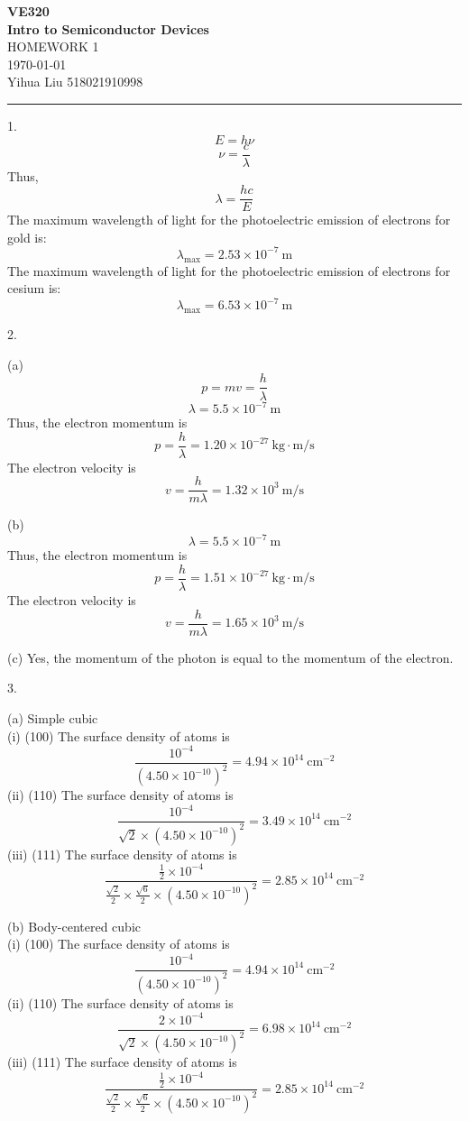 \documentclass[a4paper]{article}
\begin{document}
\begin{center}
\huge
\textbf{VE320\\Intro to Semiconductor Devices\\}
\Large
\vspace{30pt}
\uppercase{Homework 1}\\
\vspace{5pt}\today\\
\vspace{5pt}
Yihua Liu 518021910998
\vspace{5pt}
\rule[-10pt]{.97\linewidth}{0.05em}
\end{center}

1.
$$E=h\nu$$
$$\nu=\frac{c}{\lambda}$$
Thus,
$$\lambda=\frac{hc}{E}$$
The maximum wavelength of light for the photoelectric emission of electrons for gold is:
$$\lambda_\text{max}=2.53\times10^{-7}\ \text{m}$$
The maximum wavelength of light for the photoelectric emission of electrons for cesium is:
$$\lambda_\text{max}=6.53\times10^{-7}\ \text{m}$$

2.

(a)
$$p=mv=\frac{h}{\lambda}$$
$$\lambda=5.5\times10^{-7}\ \text{m}$$
Thus, the electron momentum is
$$p=\frac{h}{\lambda}=1.20\times10^{-27}\ \text{kg}\cdot\text{m/s}$$
The electron velocity is
$$v=\frac{h}{m\lambda}=1.32\times10^3\ \text{m/s}$$

(b)
$$\lambda=5.5\times10^{-7}\ \text{m}$$
Thus, the electron momentum is
$$p=\frac{h}{\lambda}=1.51\times10^{-27}\ \text{kg}\cdot\text{m/s}$$
The electron velocity is
$$v=\frac{h}{m\lambda}=1.65\times10^3\ \text{m/s}$$

(c) Yes, the momentum of the photon is equal to the momentum of the electron.

3.

(a) Simple cubic\\
(i) (100) The surface density of atoms is
$$\frac{10^{-4}}{(4.50\times10^{-10})^2}=4.94\times10^{14}\ \text{cm}^{-2}$$
(ii) (110) The surface density of atoms is
$$\frac{10^{-4}}{\sqrt{2}\times(4.50\times10^{-10})^2}=3.49\times10^{14}\ \text{cm}^{-2}$$
(iii) (111) The surface density of atoms is
$$\frac{\frac{1}{2}\times10^{-4}}{\frac{\sqrt{2}}{2}\times\frac{\sqrt{6}}{2}\times(4.50\times10^{-10})^2}=2.85\times10^{14}\ \text{cm}^{-2}$$

(b) Body-centered cubic\\
(i) (100) The surface density of atoms is
$$\frac{10^{-4}}{(4.50\times10^{-10})^2}=4.94\times10^{14}\ \text{cm}^{-2}$$
(ii) (110) The surface density of atoms is
$$\frac{2\times10^{-4}}{\sqrt{2}\times(4.50\times10^{-10})^2}=6.98\times10^{14}\ \text{cm}^{-2}$$
(iii) (111) The surface density of atoms is
$$\frac{\frac{1}{2}\times10^{-4}}{\frac{\sqrt{2}}{2}\times\frac{\sqrt{6}}{2}\times(4.50\times10^{-10})^2}=2.85\times10^{14}\ \text{cm}^{-2}$$
\end{document}
